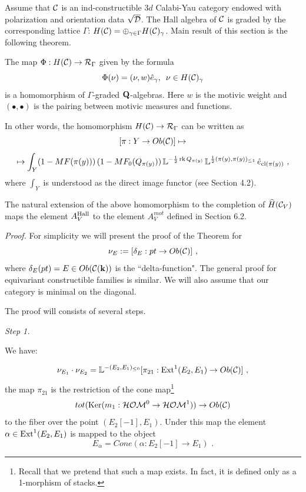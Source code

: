 \documentclass[12pt]{article}
\begin{document}
Assume  that ${\mathcal C}$ is an ind-constructible  $3d$ Calabi-Yau category endowed with polarization and orientation data $\sqrt{\cal D}$. The Hall algebra of ${\mathcal C}$ is graded by the corresponding lattice $\Gamma$: $H({\mathcal C})=\oplus_{\gamma\in \Gamma}H({\mathcal C})_{\gamma}$. Main result of this section is the following theorem.

\begin{thm} The map $\Phi: H({\mathcal C})\to {\cal R}_{\Gamma}$ given by the formula
$$\Phi(\nu)=(\nu,w)\hat{e}_{\gamma}, \,\,\,\nu\in H({\mathcal C})_{\gamma}$$
is a homomorphism of $\Gamma$-graded ${\bf Q}$-algebras. Here $w$ is the motivic weight and $(\bullet,\bullet)$ is the pairing between motivic measures and functions.


\end{thm}

In other words, the homomorphism $H({\mathcal C})\to {\cal R}_{\Gamma}$ can be written as
$$ [\pi: Y\to Ob({\mathcal C})]\mapsto $$
$$\mapsto \int_{Y}(1-MF(\pi(y)))\,(1-MF_0(Q_{\pi(y)}))\,{\mathbb L}^{-{1\over{2}}\operatorname{rk}Q_{\pi(y)}}\,{\mathbb L}^{{1\over{2}}(\pi(y),\pi(y))_{\le 1}}\,\hat{e}_{\operatorname{cl}(\pi(y))}\,\,,$$
where $\int_Y$ is understood as the direct image functor (see Section 4.2).


The natural extension of the above homomorphism to the completion of $\widehat{H}({\mathcal C}_V)$  maps the element $A_V^{\operatorname{Hall}}$ to the
element $A_V^{mot}$ defined in Section 6.2.







{\it Proof.} For simplicity we will present the proof of the Theorem for 
$$\nu_E:=[\delta_E:pt\to Ob({\mathcal C})]\,\,,$$
 where $\delta_E(pt)=E\in Ob({\mathcal C}({\bf k}))$ is the ``delta-function". The general proof for equivariant constructible families is similar.
We will also assume that our category is minimal on the diagonal.

The proof will consists of several steps.

{\it Step 1.}

We have:

$$\nu_{E_1}\cdot\nu_{E_2}={\mathbb L}^{-(E_2,E_1)_{\le 0}}[\pi_{21}:\operatorname{Ext}^1(E_2,E_1)\to Ob({\mathcal C})]\,\,,$$
the map $\pi_{21}$ is the restriction of the cone map\footnote{Recall that we pretend that such a map exists. In fact, it is defined only as a 1-morphism of stacks.} 
$$tot(\operatorname{Ker}(m_1:{\cal HOM}^0\to{\cal HOM}^1))\to Ob({\mathcal C})$$  to the fiber over the point $(E_2[-1],E_1)$.
Under this map the element $\alpha\in \operatorname{Ext}^1(E_2,E_1)$ is mapped to the object 
$$E_{\alpha}=Cone(\alpha: E_2[-1]\to E_1)\,\,.$$
\end{document}
